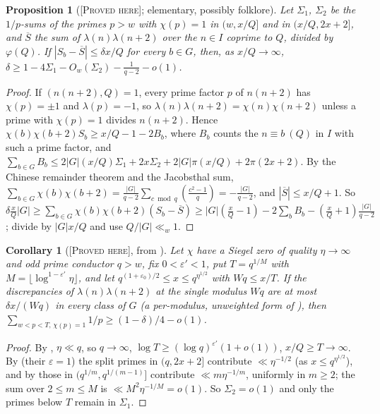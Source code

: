 \documentclass[11pt]{amsart}
\newtheorem{proposition}[theorem]{Proposition}
\newtheorem{corollary}[theorem]{Corollary}
\theoremstyle{definition}
\theoremstyle{remark}
\newcommand{\lbl}[1]{\textup{\textsc{[#1]}}}
\begin{document}
\begin{proposition}[\lbl{Proved here}; elementary, possibly folklore]\label{prop:siegel-bias}
Let $\Sigma_1$, $\Sigma_2$ be the $1/p$-sums of the primes $p>w$ with $\chi(p)=1$ in
$(w,x/Q]$ and in $(x/Q,2x+2]$, and $\overline S$ the sum of
$\lambda(n)\lambda(n+2)$ over the $n\in I$ coprime to $Q$, divided by
$\varphi(Q)$. If $|S_b-\overline S|\le\delta x/Q$ for every $b\in G$, then, as
$x/Q\to\infty$, $\delta\ge1-4\Sigma_1-O_w(\Sigma_2)-\frac1{q-2}-o(1)$.
\end{proposition}

\begin{proof}
If $(n(n+2),Q)=1$, every prime factor $p$ of $n(n+2)$ has $\chi(p)=\pm1$ and
$\lambda(p)=-1$, so $\lambda(n)\lambda(n+2)=\chi(n)\chi(n+2)$ unless a prime with
$\chi(p)=1$ divides $n(n+2)$. Hence $\chi(b)\chi(b+2)S_b\ge x/Q-1-2B_b$, where
$B_b$ counts the $n\equiv b\ (Q)$ in $I$ with such a prime factor, and
$\sum_{b\in G}B_b\le2|G|(x/Q)\Sigma_1+2x\Sigma_2+2|G|\pi(x/Q)+2\pi(2x+2)$. By the Chinese
remainder theorem and the Jacobsthal sum,
$\sum_{b\in G}\chi(b)\chi(b+2)=\frac{|G|}{q-2}\sum_{c\bmod q}\left(\frac{c^2-1}{q}\right)
=-\frac{|G|}{q-2}$, and $|\overline S|\le x/Q+1$. So
$\delta\frac xQ|G|\ge\sum_{b\in G}\chi(b)\chi(b+2)(S_b-\overline S)\ge
|G|(\frac xQ-1)-2\sum_bB_b-(\frac xQ+1)\frac{|G|}{q-2}$; divide by $|G|x/Q$ and use
$Q/|G|\ll_w1$.
\end{proof}

\begin{corollary}[\lbl{Proved here}, from {\cite[(1.4), (3.22), (3.23)]{TT22}}]\label{cor:siegel-typeI}
Let $\chi$ have a Siegel zero of quality $\eta\to\infty$ and odd prime
conductor $q>w$, fix $0<\varepsilon'<1$, put $T=q^{1/M}$ with
$M=\lfloor\log^{1-\varepsilon'}\eta\rfloor$, and let
$q^{(1+\varepsilon_0)/2}\le x\le q^{\eta^{1/2}}$ with $Wq\le x/T$. If the
discrepancies of $\lambda(n)\lambda(n+2)$ at the single modulus $Wq$ are at most
$\delta x/(Wq)$ in every class of $G$ (a per-modulus, unweighted form of
\cite[(144)]{PM8b}), then $\sum_{w<p<T,\,\chi(p)=1}1/p\ge(1-\delta)/4-o(1)$.
\end{corollary}

\begin{proof}
By \cite[(1.4)]{TT22}, $\eta\ll q$, so $q\to\infty$, $\log T\ge(\log q)^{\varepsilon'}(1+o(1))$,
$x/Q\ge T\to\infty$. By \cite[(3.22)]{TT22} (their $\varepsilon=1$) the split primes in $(q,2x+2]$
contribute $\ll\eta^{-1/2}$ (as $x\le q^{\eta^{1/2}}$), and by \cite[(3.23)]{TT22} those in
$(q^{1/m},q^{1/(m-1)}]$ contribute $\ll m\eta^{-1/m}$, uniformly in $m\ge2$;
the sum over $2\le m\le M$ is $\ll M^2\eta^{-1/M}=o(1)$. So $\Sigma_2=o(1)$ and only
the primes below $T$ remain in $\Sigma_1$.
\end{proof}
\end{document}
